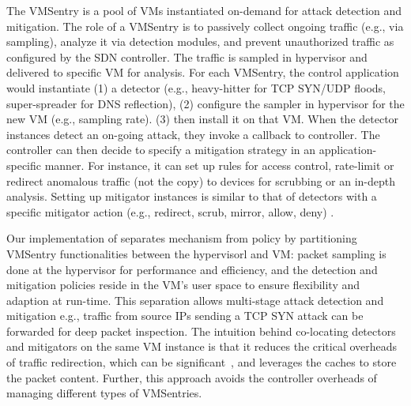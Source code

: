  The VMSentry is a pool of VMs instantiated on-demand for attack detection and mitigation. 
The role of a VMSentry is to passively collect ongoing traffic (e.g., via sampling), 
analyze it via detection modules, and prevent unauthorized traffic as configured by the SDN controller. 
The traffic is sampled in hypervisor and delivered to specific VM for analysis.
For each VMSentry, the control application 
would instantiate 
(1) a detector (e.g., heavy-hitter for TCP SYN/UDP floods, super-spreader for DNS reflection),
(2) configure the sampler in hypervisor for the new VM (e.g., sampling rate).
(3) then install it on that VM. 
When the detector instances detect an on-going attack, they invoke a callback to controller. The controller can then decide to 
specify a mitigation strategy in an application-specific manner. 
For instance, it can set up rules for access control, rate-limit or redirect 
anomalous traffic (not the copy) to \nimbus devices for scrubbing or an in-depth analysis. 
Setting up mitigator instances is similar to that of detectors with a specific mitigator action (e.g., redirect, scrub, mirror, allow, deny) .

Our implementation of \nimbus 
separates mechanism from policy by partitioning VMSentry functionalities between the hypervisorl and VM: 
packet sampling is done at the hypervisor for performance and efficiency, 
and the 
detection and mitigation policies reside in the VM's user space to ensure flexibility and adaption at run-time.
This separation allows 
multi-stage attack detection and mitigation e.g.,  traffic from source IPs sending a TCP SYN attack can be forwarded for deep packet inspection.
The intuition behind co-locating detectors and mitigators on the same VM instance 
is that it reduces the critical overheads of  
traffic redirection, which can be significant~\cite{Sylvia2011}, and leverages the caches to store the packet content. Further, this approach  
avoids the controller overheads 
of managing different types of VMSentries. 

